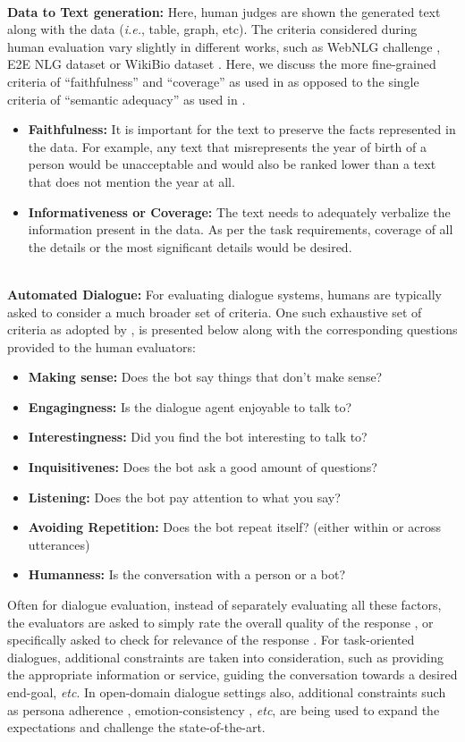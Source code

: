 ~\\    
\textbf{Data to Text generation:} 
Here, human judges are shown the generated text along with the data (\textit{i.e.}, table, graph, etc). The criteria considered during human evaluation vary slightly in different works, such as WebNLG challenge , E2E NLG dataset  or WikiBio dataset .  
Here, we discuss the more fine-grained criteria of ``faithfulness'' and ``coverage'' as used in  as opposed to the single criteria of ``semantic adequacy'' as used in .
\begin{itemize}
    \item \textbf{Faithfulness:} It is important for the text to preserve the facts represented in the data. For example, any text that misrepresents the year of birth of a person would be unacceptable and would also be ranked lower than a text that does not mention the year at all.
    \item \textbf{Informativeness or Coverage:} The text needs to adequately verbalize the information present in the data. As per the task requirements, coverage of all the details or the most significant details would be desired.
\end{itemize}
~\\
\textbf{Automated Dialogue:} For evaluating dialogue systems, humans are typically asked to consider a much broader set of criteria. One such exhaustive set of criteria as adopted by , is presented below along with the corresponding questions provided to the human evaluators:
\begin{itemize}
    \item \textbf{Making sense:} Does the bot say things that don't make sense?
    \item \textbf{Engagingness:} Is the dialogue agent enjoyable to talk to?
    \item \textbf{Interestingness:} Did you find the bot interesting to talk to?
    \item \textbf{Inquisitivenes:} Does the bot ask a good amount of questions?
    \item \textbf{Listening:} Does the bot pay attention to what you say?
    \item \textbf{Avoiding Repetition:} Does the bot repeat itself? (either within or across utterances)
    \item \textbf{Humanness:} Is the conversation with a person or a bot?
\end{itemize}
Often for dialogue evaluation, instead of separately evaluating all these factors, the evaluators are asked to simply rate the overall quality of the response , or specifically asked to check for relevance of the response . For task-oriented dialogues, additional constraints are taken into consideration, such as providing the appropriate information or service, guiding the conversation towards a desired end-goal, \textit{etc}. In open-domain dialogue settings also, additional constraints such as persona adherence , emotion-consistency , \textit{etc}, are being used to expand the expectations and challenge the state-of-the-art.
